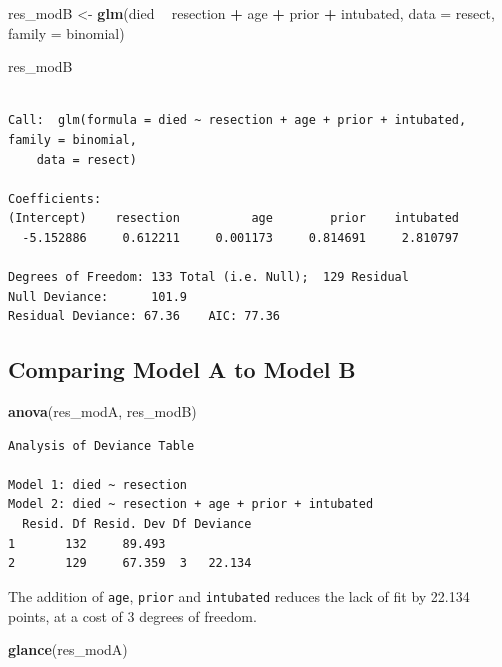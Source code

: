 \documentclass[]{book}
\newenvironment{Shaded}{\begin{snugshade}}{\end{snugshade}}
\newcommand{\KeywordTok}[1]{\textcolor[rgb]{0.13,0.29,0.53}{\textbf{#1}}}
\newcommand{\DataTypeTok}[1]{\textcolor[rgb]{0.13,0.29,0.53}{#1}}
\newcommand{\StringTok}[1]{\textcolor[rgb]{0.31,0.60,0.02}{#1}}
\newcommand{\OperatorTok}[1]{\textcolor[rgb]{0.81,0.36,0.00}{\textbf{#1}}}
\newcommand{\NormalTok}[1]{#1}
\theoremstyle{definition}
\theoremstyle{definition}
\theoremstyle{definition}
\theoremstyle{remark}
\begin{document}
\begin{Shaded}
\begin{Highlighting}[]
\NormalTok{res_modB <-}\StringTok{ }\KeywordTok{glm}\NormalTok{(died }\OperatorTok{~}\StringTok{ }\NormalTok{resection }\OperatorTok{+}\StringTok{ }\NormalTok{age }\OperatorTok{+}\StringTok{ }\NormalTok{prior }\OperatorTok{+}\StringTok{ }\NormalTok{intubated,}
               \DataTypeTok{data =}\NormalTok{ resect, }\DataTypeTok{family =}\NormalTok{ binomial)}

\NormalTok{res_modB}
\end{Highlighting}
\end{Shaded}

\begin{verbatim}

Call:  glm(formula = died ~ resection + age + prior + intubated, family = binomial, 
    data = resect)

Coefficients:
(Intercept)    resection          age        prior    intubated  
  -5.152886     0.612211     0.001173     0.814691     2.810797  

Degrees of Freedom: 133 Total (i.e. Null);  129 Residual
Null Deviance:      101.9 
Residual Deviance: 67.36    AIC: 77.36
\end{verbatim}

\subsection{Comparing Model A to Model
B}\label{comparing-model-a-to-model-b}

\begin{Shaded}
\begin{Highlighting}[]
\KeywordTok{anova}\NormalTok{(res_modA, res_modB)}
\end{Highlighting}
\end{Shaded}

\begin{verbatim}
Analysis of Deviance Table

Model 1: died ~ resection
Model 2: died ~ resection + age + prior + intubated
  Resid. Df Resid. Dev Df Deviance
1       132     89.493            
2       129     67.359  3   22.134
\end{verbatim}

The addition of \texttt{age}, \texttt{prior} and \texttt{intubated}
reduces the lack of fit by 22.134 points, at a cost of 3 degrees of
freedom.

\begin{Shaded}
\begin{Highlighting}[]
\KeywordTok{glance}\NormalTok{(res_modA)}
\end{Highlighting}
\end{Shaded}
\end{document}
